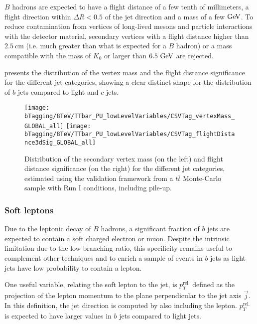     $B$ hadrons are expected to have a flight distance of a few tenth of millimeters, a
    flight direction within $\Delta R < 0.5$ of the jet direction and a mass of a few$~\text{GeV}$.
    To reduce contamination from vertices of long-lived mesons and particle interactions with
    the detector material, secondary vertices with a flight distance higher than $2.5~\text{cm}$
    (i.e. much greater than what is expected for a $B$ hadron) or a mass compatible with
    the mass of $K_0$ or larger than $6.5~\text{GeV}$ are rejected.

     presents the distribution of
    the vertex mass and the flight distance significance for the different jet categories,
    showing a clear distinct shape for the distribution of $b$ jets compared to light and
    $c$ jets.

    \begin{figure}[th!]
        \centering
        \begin{minipage}{\textwidth}
        \texttt{[image: bTagging/8TeV/TTbar\_PU\_lowLevelVariables/CSVTag\_vertexMass\_GLOBAL\_all]}
        \texttt{[image: bTagging/8TeV/TTbar\_PU\_lowLevelVariables/CSVTag\_flightDistance3dSig\_GLOBAL\_all]}
        \end{minipage}
        \caption{Distribution of the secondary vertex mass (on the left) and flight distance significance (on the right)
        for the different jet categories, estimated using the validation framework from a
        $t\bar{t}$ Monte-Carlo sample with Run I conditions, including pile-up.}
        \label{fig:bTagging/secondaryVertex}
    \end{figure}

    \subsubsection{Soft leptons}

    Due to the leptonic decay of $B$ hadrons, a significant fraction of $b$ jets are
    expected to contain a soft charged electron or muon. Despite the intrinsic limitation
    due to the low branching ratio, this specificity remains useful to complement other
    techniques and to enrich a sample of events in $b$ jets as light jets have low probability
    to contain a lepton.

    One useful variable, relating the soft lepton to the jet, is $p_T^\text{rel.}$ defined
    as the projection of the lepton momentum to the plane perpendicular to the jet axis
    $\vec{j}$. In this definition, the jet direction is computed by also including the lepton.
    $p_T^\text{rel.}$ is expected to have larger values in $b$ jets compared to light jets.

